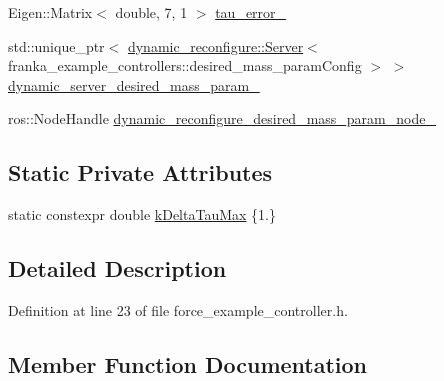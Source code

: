 \begin{DoxyCompactItemize}
\item 
Eigen\+::\+Matrix$<$ double, 7, 1 $>$ \hyperlink{classfranka__example__controllers_1_1ForceExampleController_a2e250641c7304512f8a30be65f276f63}{tau\+\_\+error\+\_\+}
\item 
std\+::unique\+\_\+ptr$<$ \hyperlink{strikes__back_2servers_2led__action__server_2src_2led__action__server__node_8cpp_a2036ae39d23f8e14a2cc8ddcd46dea5a}{dynamic\+\_\+reconfigure\+::\+Server}$<$ franka\+\_\+example\+\_\+controllers\+::desired\+\_\+mass\+\_\+param\+Config $>$ $>$ \hyperlink{classfranka__example__controllers_1_1ForceExampleController_ad17a6b653b79b4652bf39f26fda0f001}{dynamic\+\_\+server\+\_\+desired\+\_\+mass\+\_\+param\+\_\+}
\item 
ros\+::\+Node\+Handle \hyperlink{classfranka__example__controllers_1_1ForceExampleController_a52ea54759485f09d5b7985b56f1d592a}{dynamic\+\_\+reconfigure\+\_\+desired\+\_\+mass\+\_\+param\+\_\+node\+\_\+}
\end{DoxyCompactItemize}
\subsection*{Static Private Attributes}
\begin{DoxyCompactItemize}
\item 
static constexpr double \hyperlink{classfranka__example__controllers_1_1ForceExampleController_aa8d9d933646084d16500a53eea9e314c}{k\+Delta\+Tau\+Max} \{1.\}
\end{DoxyCompactItemize}


\subsection{Detailed Description}


Definition at line 23 of file force\+\_\+example\+\_\+controller.\+h.



\subsection{Member Function Documentation}
\mbox{\label{classfranka__example__controllers_1_1ForceExampleController_ac7db01746d2398acab73424e6a98f501}} 
